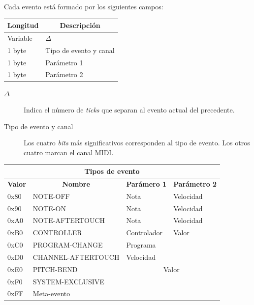Cada evento está formado por los siguientes campos:

\smallskip

\begin{center}
	\begin{tabular}{|l|l|}
		\hline \multicolumn{1}{|c|}{\textbf{Longitud}} & \multicolumn{1}{c|}{\textbf{Descripción}} \\
		\hline Variable & $\Delta$ \\ 
		\hline 1 byte & Tipo de evento y canal \\ 
		\hline 1 byte & Parámetro 1 \\ 
		\hline 1 byte & Parámetro 2 \\ 
		\hline 
	\end{tabular}
	\smallskip
\end{center}

\smallskip

\begin{description}
	\item[$\Delta$] Indica el número de \textit{ticks} que separan al evento actual del precedente.
	\item[Tipo de evento y canal] Los cuatro \textit{bits} más significativos corresponden al tipo de evento. Los otros cuatro marcan el canal \acrshort{MIDI}.
\end{description}

\smallskip

\begin{center}
	\begin{tabular}{|l|l|l|l|}
		\hline \multicolumn{4}{|c|}{\textbf{Tipos de evento}} \\
		\hline \multicolumn{1}{|c|}{\textbf{Valor}} & \multicolumn{1}{c|}{\textbf{Nombre}} & \multicolumn{1}{c|}{\textbf{Parámero 1}} & \multicolumn{1}{c|}{\textbf{Parámetro 2}} \\
		\hline 0x80 & NOTE-OFF & Nota & Velocidad \\
		\hline 0x90 & NOTE-ON & Nota & Velocidad \\
		\hline 0xA0 & NOTE-AFTERTOUCH & Nota & Velocidad \\
		\hline 0xB0 & CONTROLLER & Controlador & Valor \\
		\hline 0xC0 & PROGRAM-CHANGE & Programa &  \\
		\hline 0xD0 & CHANNEL-AFTERTOUCH & Velocidad &  \\
		\hline 0xE0 & PITCH-BEND & \multicolumn{2}{c|}{Valor} \\
		\hline 0xF0 & SYSTEM-EXCLUSIVE & \multicolumn{2}{c|}{} \\
		\hline 0xFF & Meta-evento & \multicolumn{2}{c|}{} \\
		\hline 
	\end{tabular}
	\smallskip
\end{center}

